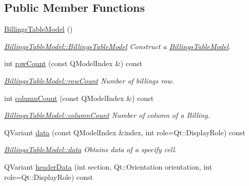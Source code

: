 \subsection*{Public Member Functions}
\begin{DoxyCompactItemize}
\item 
\hyperlink{classGui_1_1Widgets_1_1WdgModels_1_1BillingsTableModel_a7ac53a3ff1222c15e264cff34b830582}{Billings\-Table\-Model} ()
\begin{DoxyCompactList}\small\item\em \hyperlink{classGui_1_1Widgets_1_1WdgModels_1_1BillingsTableModel_a7ac53a3ff1222c15e264cff34b830582}{Billings\-Table\-Model\-::\-Billings\-Table\-Model} Construct a \hyperlink{classGui_1_1Widgets_1_1WdgModels_1_1BillingsTableModel}{Billings\-Table\-Model}. \end{DoxyCompactList}\item 
int \hyperlink{classGui_1_1Widgets_1_1WdgModels_1_1BillingsTableModel_aeda0c27a114bab611363cb46c5119b10}{row\-Count} (const Q\-Model\-Index \&) const 
\begin{DoxyCompactList}\small\item\em \hyperlink{classGui_1_1Widgets_1_1WdgModels_1_1BillingsTableModel_aeda0c27a114bab611363cb46c5119b10}{Billings\-Table\-Model\-::row\-Count} Number of billings row. \end{DoxyCompactList}\item 
int \hyperlink{classGui_1_1Widgets_1_1WdgModels_1_1BillingsTableModel_a361398f7c11d07a2303c4c5236b3c944}{column\-Count} (const Q\-Model\-Index \&) const 
\begin{DoxyCompactList}\small\item\em \hyperlink{classGui_1_1Widgets_1_1WdgModels_1_1BillingsTableModel_a361398f7c11d07a2303c4c5236b3c944}{Billings\-Table\-Model\-::column\-Count} Number of column of a Billing. \end{DoxyCompactList}\item 
Q\-Variant \hyperlink{classGui_1_1Widgets_1_1WdgModels_1_1BillingsTableModel_a2b83574c5ed7a98f1b311e14e4112d13}{data} (const Q\-Model\-Index \&index, int role=Qt\-::\-Display\-Role) const 
\begin{DoxyCompactList}\small\item\em \hyperlink{classGui_1_1Widgets_1_1WdgModels_1_1BillingsTableModel_a2b83574c5ed7a98f1b311e14e4112d13}{Billings\-Table\-Model\-::data} Obtains data of a specify cell. \end{DoxyCompactList}\item 
Q\-Variant \hyperlink{classGui_1_1Widgets_1_1WdgModels_1_1BillingsTableModel_af441051dcb0c702ca9d390405bd8bbc9}{header\-Data} (int section, Qt\-::\-Orientation orientation, int role=Qt\-::\-Display\-Role) const 

\end{DoxyCompactItemize}
